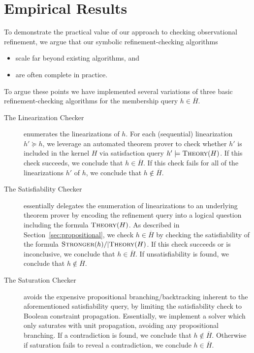 
\section{Empirical Results}
\label{sec:exp}

To demonstrate the practical value of our approach to checking observational
refinement, we argue that our symbolic refinement-checking algorithms
\begin{itemize}

  \item scale far beyond existing algorithms, and

  \item are often complete in practice.

\end{itemize}
To argue these points we have implemented several variations of three basic
refinement-checking algorithms for the membership query $h \in \overline{H}$.

\begin{description}

  \item[The Linearization Checker] enumerates the linearizations of $h$. For
  each (sequential) linearization $h' \succeq h$, we leverage an automated
  theorem prover to check whether $h'$ is included in the kernel $H$ via
  satisfaction query $h' |= \textsc{Theory}(H)$. If this check succeeds, we
  conclude that $h \in \overline{H}$. If this check fails for all of the
  linearizations $h'$ of $h$, we conclude that $h \not\in \overline{H}$.

  \item[The Satisfiability Checker] essentially delegates the enumeration of
  linearizations to an underlying theorem prover by encoding the refinement
  query into a logical question including the formula $\textsc{Theory}(H)$. As
  described in Section~\ref{sec:propositional}, we check $h \in \overline{H}$
  by checking the satisfiability of the formula $\textsc{Stronger}(h) /|
  \textsc{Theory}(H)$. If this check succeeds or is inconclusive, we conclude
  that $h \in \overline{H}$. If unsatisfiability is found, we conclude that $h
  \not\in \overline{H}$.

  \item[The Saturation Checker] avoids the expensive propositional
  branching/backtracking inherent to the aforementioned satisfiability query,
  by limiting the satisfiability check to Boolean constraint propagation.
  Essentially, we implement a solver which only saturates with unit
  propagation, avoiding any propositional branching. If a contradiction is
  found, we conclude that $h \not\in \overline{H}$. Otherwise if saturation
  fails to reveal a contradiction, we conclude $h \in \overline{H}$.

\end{description}

